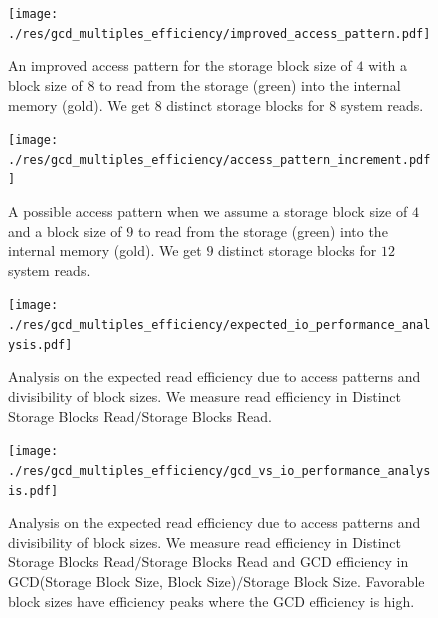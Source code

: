 \documentclass[twocolumn]{article}
\begin{document}
\begin{figure}[htb]
    \begin{minipage}{0.475 \textwidth}
        \centering
        \texttt{[image: ./res/gcd\_multiples\_efficiency/improved\_access\_pattern.pdf]}
        \caption{An improved access pattern for the storage block size of \( 4 \) with a block size of \( 8 \) to read from the storage (green) into the internal memory (gold).
            We get \( 8 \) distinct storage blocks for \( 8 \) system reads. }
        \label{fig:improved_access_pattern.pdf}
    \end{minipage}
\end{figure}

\begin{figure}[htb]
    \begin{minipage}{0.475 \textwidth}
        \centering
        \texttt{[image: ./res/gcd\_multiples\_efficiency/access\_pattern\_increment.pdf]}
        \caption{A possible access pattern when we assume a storage block size of \( 4 \) and a block size of \( 9 \) to read from the storage (green) into the internal memory (gold).
            We get \( 9 \) distinct storage blocks for \( 12 \) system reads. }
        \label{fig:access_pattern_increment.pdf}
    \end{minipage}
\end{figure}

\begin{figure}[htb]
    \begin{minipage}{0.475 \textwidth}
        \centering
        \texttt{[image: ./res/gcd\_multiples\_efficiency/expected\_io\_performance\_analysis.pdf]}
        \caption{Analysis on the expected read efficiency due to access patterns and divisibility of block sizes. We measure read efficiency in Distinct Storage Blocks Read\( / \)Storage Blocks Read. }
        \label{fig:expected_io_performance_analysis.pdf}
    \end{minipage}
\end{figure}

\begin{figure}[htb]
    \begin{minipage}{0.475 \textwidth}
        \centering
        \texttt{[image: ./res/gcd\_multiples\_efficiency/gcd\_vs\_io\_performance\_analysis.pdf]}
        \caption{Analysis on the expected read efficiency due to access patterns and divisibility of block sizes. We measure read efficiency in Distinct Storage Blocks Read\( / \)Storage Blocks Read and
            GCD efficiency in GCD(Storage Block Size, Block Size)\( / \)Storage Block Size. Favorable block sizes have efficiency peaks where the GCD efficiency is high. }
        \label{fig:gcd_vs_io_performance_analysis.pdf}
    \end{minipage}
\end{figure}
\end{document}
